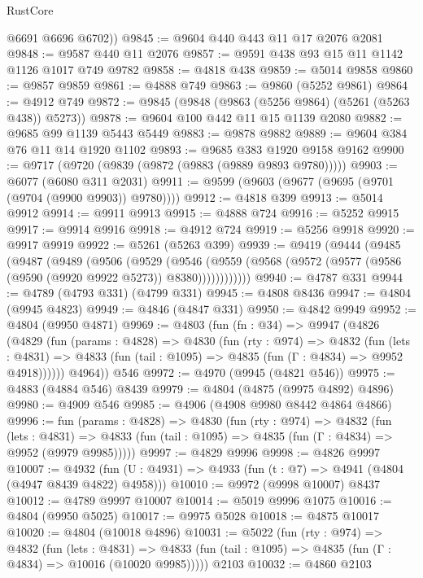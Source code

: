 \begin{lexlean}{RustCore}
\begin{coremodule}
        @6691
        @6696
        @6702))
@9845 := @9604 @440 @443 @11 @17 @2076 @2081
@9848 := @9587 @440 @11 @2076
@9857 := @9591 @438 @93 @15 @11 @1142 @1126 @1017 @749 @9782
@9858 := @4818 @438
@9859 := @5014 @9858
@9860 := @9857 @9859
@9861 := @4888 @749
@9863 := @9860 (@5252 @9861)
@9864 := @4912 @749
@9872 := @9845 (@9848 (@9863 (@5256 @9864) (@5261 (@5263 @438)) @5273))
@9878 := @9604 @100 @442 @11 @15 @1139 @2080
@9882 := @9685 @99 @1139 @5443 @5449
@9883 := @9878 @9882
@9889 := @9604 @384 @76 @11 @14 @1920 @1102
@9893 := @9685 @383 @1920 @9158 @9162
@9900 := @9717 (@9720 (@9839 (@9872 (@9883 (@9889 @9893 @9780)))))
@9903 := @6077 (@6080 @311 @2031)
@9911 := @9599 (@9603 (@9677 (@9695 (@9701 (@9704 (@9900 @9903)) @9780))))
@9912 := @4818 @399
@9913 := @5014 @9912
@9914 := @9911 @9913
@9915 := @4888 @724
@9916 := @5252 @9915
@9917 := @9914 @9916
@9918 := @4912 @724
@9919 := @5256 @9918
@9920 := @9917 @9919
@9922 := @5261 (@5263 @399)
@9939 := @9419
    (@9444
      (@9485
        (@9487
          (@9489
            (@9506
              (@9529
                (@9546
                  (@9559 (@9568 (@9572 (@9577 (@9586 (@9590 (@9920 @9922 @5273)) @8380))))))))))))
@9940 := @4787 @331
@9944 := @4789 (@4793 @331) (@4799 @331)
@9945 := @4808 @8436
@9947 := @4804 (@9945 @4823)
@9949 := @4846 (@4847 @331)
@9950 := @4842 @9949
@9952 := @4804 (@9950 @4871)
@9969 := @4803
    (fun (fn : @34) =>
    @9947
      (@4826
        (@4829
          (fun (params : @4828) =>
          @4830
            (fun (rty : @974) =>
            @4832
              (fun (lets : @4831) =>
              @4833 (fun (tail : @1095) => @4835 (fun (Γ : @4834) => @9952 @4918))))))
        @4964))
    @546
@9972 := @4970 (@9945 (@4821 @546))
@9975 := @4883 (@4884 @546) @8439
@9979 := @4804 (@4875 (@9975 @4892) @4896)
@9980 := @4909 @546
@9985 := @4906 (@4908 @9980 @8442 @4864 @4866)
@9996 := fun (params : @4828) =>
  @4830
    (fun (rty : @974) =>
    @4832
      (fun (lets : @4831) =>
      @4833 (fun (tail : @1095) => @4835 (fun (Γ : @4834) => @9952 (@9979 @9985)))))
@9997 := @4829 @9996
@9998 := @4826 @9997
@10007 := @4932 (fun (U : @4931) => @4933 (fun (t : @7) => @4941 (@4804 (@4947 @8439 @4822) @4958)))
@10010 := @9972 (@9998 @10007) @8437
@10012 := @4789 @9997 @10007
@10014 := @5019 @9996 @1075
@10016 := @4804 (@9950 @5025)
@10017 := @9975 @5028
@10018 := @4875 @10017
@10020 := @4804 (@10018 @4896)
@10031 := @5022
    (fun (rty : @974) =>
    @4832
      (fun (lets : @4831) =>
      @4833 (fun (tail : @1095) => @4835 (fun (Γ : @4834) => @10016 (@10020 @9985)))))
    @2103
@10032 := @4860 @2103

\end{coremodule}
\end{lexlean}
